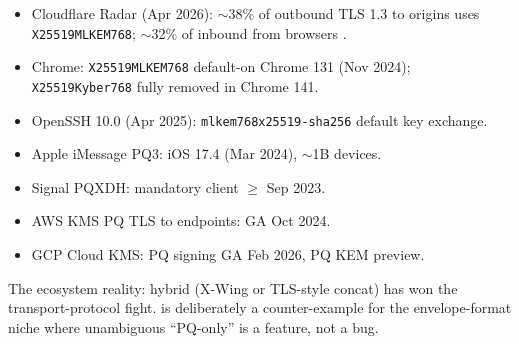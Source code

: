 \begin{itemize}
\item Cloudflare Radar (Apr 2026): $\sim$38\% of outbound TLS 1.3 to origins uses \texttt{X25519MLKEM768}; $\sim$32\% of inbound from browsers \citep{cloudflare-radar}.
\item Chrome: \texttt{X25519MLKEM768} default-on Chrome 131 (Nov 2024); \texttt{X25519Kyber768} fully removed in Chrome 141.
\item OpenSSH 10.0 (Apr 2025): \texttt{mlkem768x25519-sha256} default key exchange.
\item Apple iMessage PQ3: iOS 17.4 (Mar 2024), $\sim$1B devices.
\item Signal PQXDH: mandatory client $\geq$ Sep 2023.
\item AWS KMS PQ TLS to endpoints: GA Oct 2024.
\item GCP Cloud KMS: PQ signing GA Feb 2026, PQ KEM preview.
\end{itemize}

The ecosystem reality: hybrid (X-Wing or TLS-style concat) has won the transport-protocol fight. \pqcrypt{} is deliberately a counter-example for the envelope-format niche where unambiguous ``PQ-only'' is a feature, not a bug.
